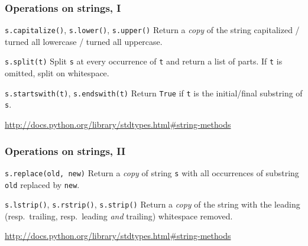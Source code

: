 \documentclass[english,serif,mathserif,xcolor=pdftex,dvipsnames,table]{beamer}
\begin{document}
\begin{frame}[fragile]
  \frametitle{Operations on strings, I}
  \begin{describe}{%
      \lstinline|s.capitalize()|,
      \lstinline|s.lower()|,
      \lstinline|s.upper()|}
    Return a \emph{copy} of the string capitalized / turned all lowercase /
    turned all uppercase.
  \end{describe}

  \begin{describe}{\lstinline|s.split(t)|}
    Split \texttt{s} at every occurrence of \texttt{t} and return a list
    of parts.  If \texttt{t} is omitted, split on whitespace.
  \end{describe}

  \begin{describe}{\lstinline|s.startswith(t)|,
      \lstinline|s.endswith(t)|}
    Return \texttt{True} if \texttt{t} is the initial/final substring
    of \texttt{s}.
  \end{describe}

  \begin{references}
    \url{http://docs.python.org/library/stdtypes.html#string-methods}
  \end{references}
\end{frame}


\begin{frame}[fragile]
  \frametitle{Operations on strings, II}
  \begin{describe}{\lstinline|s.replace(old, new)|}
    Return a \emph{copy} of string \texttt{s} with all occurrences of
    substring \texttt{old} replaced by \texttt{new}.
  \end{describe}

  \begin{describe}{%
      \lstinline|s.lstrip()|,
      \lstinline|s.rstrip()|,
      \lstinline|s.strip()|}
    Return a \emph{copy} of the string with the leading (resp.\ trailing,
    resp.\ leading \emph{and} trailing) whitespace removed.
  \end{describe}

  \begin{references}
    \url{http://docs.python.org/library/stdtypes.html#string-methods}
  \end{references}
\end{frame}
\end{document}
